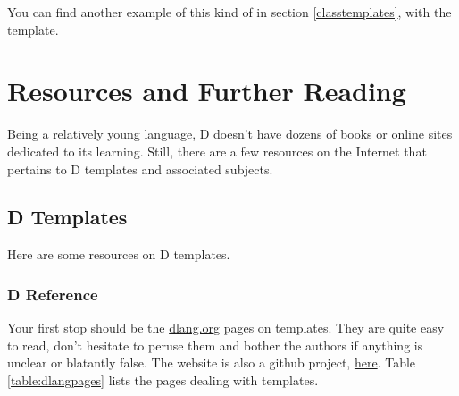 You can find another example of this kind of  in section \ref{classtemplates}, with the  template.

\section{Resources and Further Reading}
\label{resources}


Being a relatively young language, D doesn't have dozens of books or online sites dedicated to its learning. Still, there are a few resources on the Internet that pertains to D templates and associated subjects.

\subsection{D Templates}

Here are some resources on D templates.

\subsubsection{D Reference}
\label{dreference}

Your first stop should be the \href{http://dlang.org}{dlang.org} pages on templates. They are quite easy to read, don't hesitate to peruse them and bother the authors if anything is unclear or blatantly false. The  website is also a github project, \href{https://github.com/D-Programming-Language/d-programming-language.org}{here}. Table \ref{table:dlangpages} lists the pages dealing with templates.

